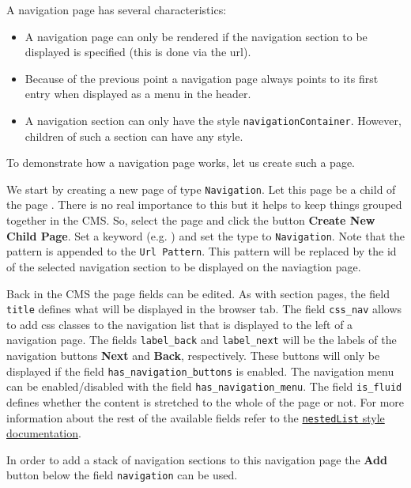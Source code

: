 \documentclass[a4paper,oneside]{book}
\begin{document}
A navigation page has several characteristics:
\begin{itemize}
    \item A navigation page can only be rendered if the navigation section to be displayed is specified (this is done via the url).
    \item Because of the previous point a navigation page always points to its first entry when displayed as a menu in the header.
    \item A navigation section can only have the style \texttt{navigationContainer}. However, children of such a section can have any style.
\end{itemize}

To demonstrate how a navigation page works, let us create such a page.

We start by creating a new page of type \texttt{Navigation}.
Let this page be a child of the page .
There is no real importance to this but it helps to keep things grouped together in the CMS.
So, select the page  and click the button \textbf{Create New Child Page}.
Set a keyword (e.g. ) and set the type to \texttt{Navigation}.
Note that the pattern  is appended to the \texttt{Url Pattern}.
This pattern will be replaced by the id of the selected navigation section to be displayed on the naviagtion page.

Back in the CMS the page fields can be edited.
As with section pages, the field \texttt{title} defines what will be displayed in the browser tab.
The field \texttt{css\_nav} allows to add css classes to the navigation list that is displayed to the left of a navigation page.
The fields \texttt{label\_back} and \texttt{label\_next} will be the labels of the navigation buttons \textbf{Next} and \textbf{Back}, respectively.
These buttons will only be displayed if the field \texttt{has\_navigation\_buttons} is enabled.
The navigation menu can be enabled/disabled with the field \texttt{has\_navigation\_menu}.
The field \texttt{is\_fluid} defines whether the content is stretched to the whole of the page or not.
For more information about the rest of the available fields refer to the \href{https://selfhelp.psy.unibe.ch/demo/style/362}{\texttt{nestedList} style documentation}.

In order to add a stack of navigation sections to this navigation page the \textbf{Add} button below the field \texttt{navigation} can be used.
\end{document}
